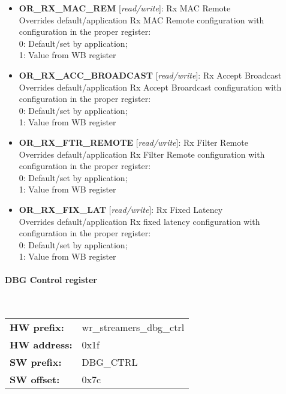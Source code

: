 \begin{itemize}
\begin{small}
{\bf 
OR\_RX\_MAC\_LOC
} [\emph{read/write}]: Rx MAC Local
\\
Overrides default/application Rx MAC Local configuration with configuration in the proper register:\\      0: Default/set by application; \\      1: Value from WB register
\end{small}
\item \begin{small}
{\bf 
OR\_RX\_MAC\_REM
} [\emph{read/write}]: Rx MAC Remote
\\
Overrides default/application Rx MAC Remote configuration with configuration in the proper register:\\      0: Default/set by application; \\      1: Value from WB register
\end{small}
\item \begin{small}
{\bf 
OR\_RX\_ACC\_BROADCAST
} [\emph{read/write}]: Rx Accept Broadcast
\\
Overrides default/application Rx Accept Broardcast configuration with configuration in the proper register:\\      0: Default/set by application; \\      1: Value from WB register
\end{small}
\item \begin{small}
{\bf 
OR\_RX\_FTR\_REMOTE
} [\emph{read/write}]: Rx Filter Remote
\\
Overrides default/application Rx Filter Remote configuration with configuration in the proper register:\\      0: Default/set by application; \\      1: Value from WB register
\end{small}
\item \begin{small}
{\bf 
OR\_RX\_FIX\_LAT
} [\emph{read/write}]: Rx Fixed Latency 
\\
Overrides default/application Rx fixed latency configuration with configuration in the proper register:\\      0: Default/set by application; \\      1: Value from WB register
\end{small}
\end{itemize}
\paragraph*{DBG Control register}\mbox{}\\\vskip 6pt
\begin{tabular}{l l }
{\bf HW prefix:}  & wr\_streamers\_dbg\_ctrl\\
{\bf HW address:}  & 0x1f\\
{\bf SW prefix:}  & DBG\_CTRL\\
{\bf SW offset:}  & 0x7c\\
\end{tabular}

